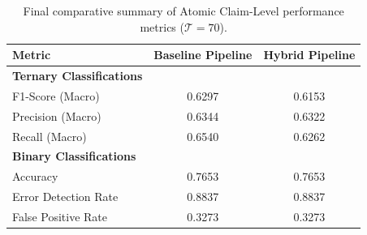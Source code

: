 \begin{table}[htbp]
    \centering
    \caption{Final comparative summary of Atomic Claim-Level performance metrics ($\mathcal{T} = 70$).}
    \label{tab:final_atomic_comparison}
    \renewcommand{\arraystretch}{1.2}
    \begin{tabular}{l c c}
        \toprule
        \textbf{Metric} & \textbf{Baseline Pipeline} & \textbf{Hybrid Pipeline} \\
        \midrule
        \textbf{Ternary Classifications} & & \\
        F1-Score (Macro) & 0.6297 & 0.6153 \\
        Precision (Macro) & 0.6344 & 0.6322 \\
        Recall (Macro) & 0.6540 & 0.6262 \\
        \midrule
        \textbf{Binary Classifications} & & \\
        Accuracy & 0.7653 & 0.7653 \\
        Error Detection Rate & 0.8837 & 0.8837 \\
        False Positive Rate & 0.3273 & 0.3273 \\
        \bottomrule
    \end{tabular}
\end{table}